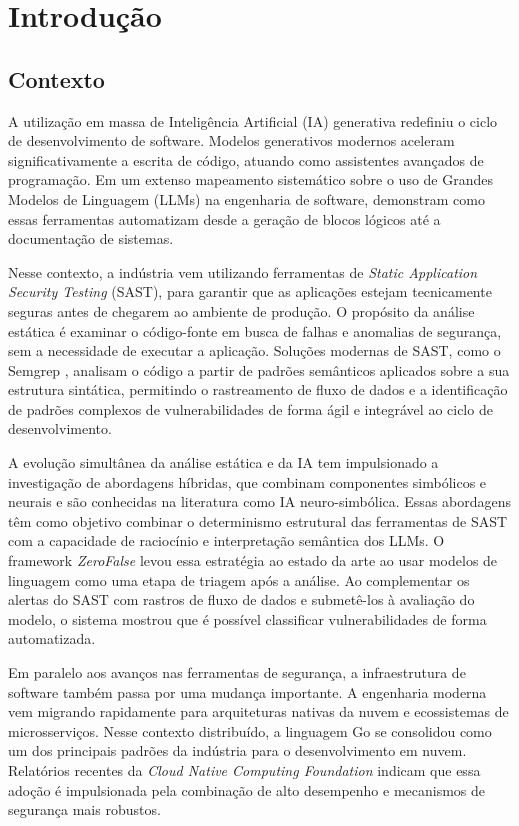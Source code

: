 \chapter[Introdução]{Introdução}


\section{Contexto}

A utilização em massa de Inteligência Artificial (IA) generativa redefiniu o ciclo de desenvolvimento de software. Modelos generativos modernos aceleram significativamente a escrita de código, atuando como assistentes avançados de programação. Em um extenso mapeamento sistemático sobre o uso de Grandes Modelos de Linguagem (LLMs) na engenharia de software,  demonstram como essas ferramentas automatizam desde a geração de blocos lógicos até a documentação de sistemas.

Nesse contexto, a indústria vem utilizando ferramentas de \textit{Static Application Security Testing} (SAST), para garantir que as aplicações estejam tecnicamente seguras antes de chegarem ao ambiente de produção. O propósito da análise estática é examinar o código-fonte em busca de falhas e anomalias de segurança, sem a necessidade de executar a aplicação. Soluções modernas de SAST, como o Semgrep \cite{semgrepdocs}, analisam o código a partir de padrões semânticos aplicados sobre a sua estrutura sintática, permitindo o rastreamento de fluxo de dados e a identificação de padrões complexos de vulnerabilidades de forma ágil e integrável ao ciclo de desenvolvimento.

A evolução simultânea da análise estática e da IA tem impulsionado a investigação de abordagens híbridas, que combinam componentes simbólicos e neurais e são conhecidas na literatura como IA neuro-simbólica. Essas abordagens têm como objetivo combinar o determinismo estrutural das ferramentas de SAST com a capacidade de raciocínio e interpretação semântica dos LLMs. O framework \textit{ZeroFalse} \cite{iranmanesh2025zerofalseimprovingprecisionstatic} levou essa estratégia ao estado da arte ao usar modelos de linguagem como uma etapa de triagem após a análise. Ao complementar os alertas do SAST com rastros de fluxo de dados e submetê-los à avaliação do modelo, o sistema mostrou que é possível classificar vulnerabilidades de forma automatizada.

Em paralelo aos avanços nas ferramentas de segurança, a infraestrutura de software também passa por uma mudança importante. A engenharia moderna vem migrando rapidamente para arquiteturas nativas da nuvem e ecossistemas de microsserviços. Nesse contexto distribuído, a linguagem Go se consolidou como um dos principais padrões da indústria para o desenvolvimento em nuvem. Relatórios recentes da \textit{Cloud Native Computing Foundation} \cite{cncf2025survey} indicam que essa adoção é impulsionada pela combinação de alto desempenho e mecanismos de segurança mais robustos.


